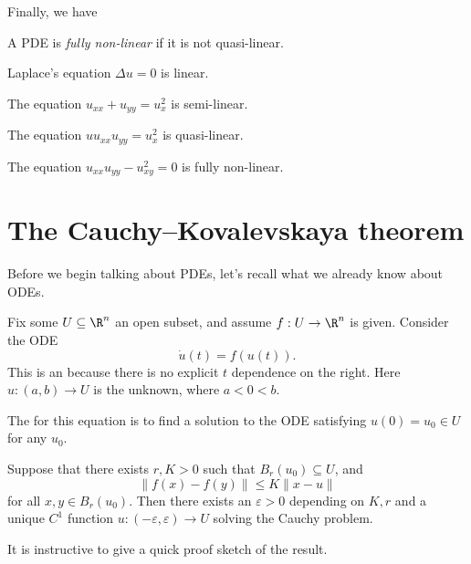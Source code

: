 \documentclass[a4paper]{article}
\begin{document}
Finally, we have
\begin{defi}
  A PDE is \emph{fully non-linear} if it is not quasi-linear.
\end{defi}

\begin{eg}
  Laplace's equation $\Delta u = 0$ is linear.
\end{eg}

\begin{eg}
  The equation $u_{xx} + u_{yy} = u_x^2$ is semi-linear.
\end{eg}

\begin{eg}
  The equation $uu_{xx} u_{yy} = u_x^2$ is quasi-linear.
\end{eg}

\begin{eg}
  The equation $u_{xx} u_{yy} - u_{xy}^2 = 0$ is fully non-linear.
\end{eg}

\section{The Cauchy--Kovalevskaya theorem}
Before we begin talking about PDEs, let's recall what we already know about ODEs.

Fix some $U \subseteq \R^n$ an open subset, and assume $f: U \to \R^n$ is given. Consider the ODE
\[
  \dot{u}(t) = f(u(t)).
\]
This is an  because there is no explicit $t$ dependence on the right. Here $u: (a, b) \to U$ is the unknown, where $a < 0 < b$.

The  for this equation is to find a solution to the ODE satisfying $u(0) = u_0 \in U$ for any $u_0$.

\begin{thm}
  Suppose that there exists $r, K > 0$ such that $B_r(u_0) \subseteq U$, and
  \[
    \|f(x) - f(y)\| \leq K \|x - u\|
  \]
  for all $x, y \in B_r(u_0)$. Then there exists an $\varepsilon > 0$ depending on $K, r$ and a unique $C^1$ function $u: (-\varepsilon, \varepsilon) \to U$ solving the Cauchy problem.
\end{thm}

It is instructive to give a quick proof sketch of the result.
\end{document}
